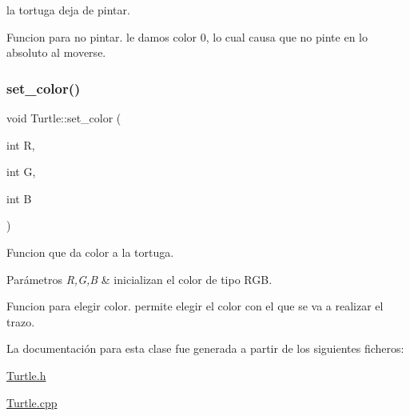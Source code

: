la tortuga deja de pintar.

Funcion para no pintar. le damos color 0, lo cual causa que no pinte en lo absoluto al moverse. \mbox{\label{classTurtle_ad4f1cfec231a2d91c529d20c2331168b}} 
\subsubsection{\texorpdfstring{set\+\_\+color()}{set\_color()}}
{\footnotesize\ttfamily void Turtle\+::set\+\_\+color (\begin{DoxyParamCaption}\item[{int}]{R,  }\item[{int}]{G,  }\item[{int}]{B }\end{DoxyParamCaption})}

Funcion que da color a la tortuga. 
\begin{DoxyParams}{Parámetros}
{\em R,G,B} & inicializan el color de tipo R\+GB.\\
\hline
\end{DoxyParams}
Funcion para elegir color. permite elegir el color con el que se va a realizar el trazo. 

La documentación para esta clase fue generada a partir de los siguientes ficheros\+:\begin{DoxyCompactItemize}
\item 
\hyperlink{Turtle_8h}{Turtle.\+h}\item 
\hyperlink{Turtle_8cpp}{Turtle.\+cpp}\end{DoxyCompactItemize}

